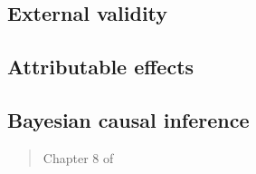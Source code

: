 \documentclass[12pt]{article}
\begin{document}
\begin{verse}  \end{verse}

\subsection{External validity}

\begin{verse}  \end{verse}

\begin{verse}  \end{verse}

\begin{verse}  \end{verse}

\subsection{Attributable effects}

\begin{verse}  \end{verse}

\begin{verse}  \end{verse}

\begin{verse}  \end{verse}

\subsection{Bayesian causal inference}

\begin{verse}  \end{verse}

\begin{verse} Chapter 8 of  \end{verse}

\begin{verse}  \end{verse}

\begin{verse}  \end{verse}

\clearpage

\end{document}
